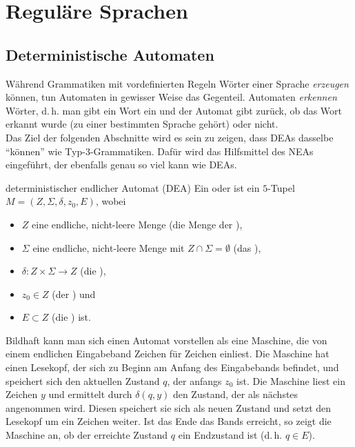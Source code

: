 \chapter{%
    Reguläre Sprachen%
}

\section{%
    Deterministische Automaten%
}

\begin{Bem}
    Während Grammatiken mit vordefinierten Regeln Wörter einer Sprache
    \emph{erzeugen} können, tun Automaten in gewisser Weise das Gegenteil.
    Automaten \emph{erkennen} Wörter, d.\,h. man gibt ein Wort ein und der
    Automat gibt zurück, ob das Wort erkannt wurde
    (zu einer bestimmten Sprache gehört) oder nicht.\\
    Das Ziel der folgenden Abschnitte wird es sein zu zeigen, dass
    DEAs dasselbe "`können"' wie Typ-3-Grammatiken.
    Dafür wird das Hilfsmittel des NEAs eingeführt, der ebenfalls genau so viel
    kann wie DEAs.
\end{Bem}

\linie

\begin{Def}{deterministischer endlicher Automat (DEA)}
    Ein 
    oder  ist ein $5$-Tupel $M = (Z, \Sigma, \delta, z_0, E)$,
    wobei
    \begin{itemize}
        \item
        $Z$ eine endliche, nicht-leere Menge
        (die Menge der ),

        \item
        $\Sigma$ eine endliche, nicht-leere Menge
        mit $Z \cap \Sigma = \emptyset$
        (das ),

        \item
        $\delta\colon Z \times \Sigma \rightarrow Z$
        (die ),

        \item
        $z_0 \in Z$ (der ) und

        \item
        $E \subset Z$ (die ) ist.
    \end{itemize}
\end{Def}

\begin{Bem}
    Bildhaft kann man sich einen Automat vorstellen als eine Maschine,
    die von einem endlichen Eingabeband Zeichen für Zeichen einliest.
    Die Maschine hat einen Lesekopf, der sich zu Beginn am Anfang des
    Eingabebands befindet, und speichert sich den aktuellen Zustand $q$,
    der anfangs $z_0$ ist.
    Die Maschine liest ein Zeichen $y$ und ermittelt durch $\delta(q, y)$
    den Zustand, der als nächstes angenommen wird.
    Diesen speichert sie sich als neuen Zustand und setzt den Lesekopf um ein
    Zeichen weiter.
    Ist das Ende das Bands erreicht, so zeigt die Maschine an,
    ob der erreichte Zustand $q$ ein Endzustand ist
    (d.\,h. $q \in E$).
\end{Bem}

